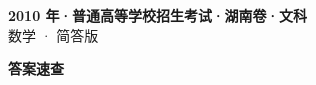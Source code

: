 \documentclass[zihao=-4, a4paper]{ctexart}
\begin{document}
\begin{center}
  {\Large\bfseries 2010 年·普通高等学校招生考试·湖南卷·文科}\\[4pt]
  {\large 数学 · 简答版}
\end{center}
\medskip
{}

\clearpage
{}
\begin{center}{\Large\bfseries 答案速查}\end{center}
\medskip

\end{document}
